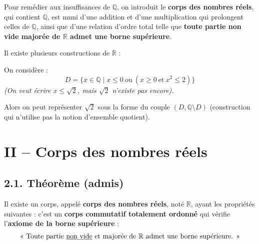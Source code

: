 \documentclass[a4paper,11pt]{article}
\newcommand{\R}{\mathbb{R}}
\newcommand{\Q}{\mathbb{Q}}
\newcommand{\mot}[1]{\textcolor{bordeaux}{\textbf{#1}}}
\begin{document}
Pour remédier aux insuffisances de $\Q$, on introduit le \mot{corps des nombres réels}, qui contient $\Q$, est muni d'une addition et d'une multiplication qui prolongent celles de $\Q$, ainsi que d'une relation d'ordre total telle que \mot{toute partie non vide majorée de $\R$ admet une borne supérieure}.

Il existe plusieurs constructions de $\R$ :
\begin{exemples}
On considère :
\[
D = \{ x \in \Q \mid x \le 0 \ \text{ou} \ (x \ge 0 \ \text{et} \ x^2 \le 2) \}
\]
\textit{(On veut écrire $x \le \sqrt{2}$, mais $\sqrt{2}$ n'existe pas encore).}

\begin{center}
\end{center}
Alors on peut représenter $\sqrt{2}$ sous la forme du couple $(D, \Q \setminus D)$ (construction qui n'utilise pas la notion d'ensemble quotient).
\end{exemples}

\newpage
\section{II -- Corps des nombres réels}

\subsection{2.1. Théorème (admis)}

\begin{theoreme}[Admis]
Il existe un corps, appelé \mot{corps des nombres réels}, noté $\R$, ayant les propriétés suivantes : c'est un \mot{corps commutatif totalement ordonné} qui vérifie l'\mot{axiome de la borne supérieure} :
\[
\text{« Toute partie \underline{non vide} et majorée de } \R \text{ admet une borne supérieure. »}
\]
\end{theoreme}
\end{document}
